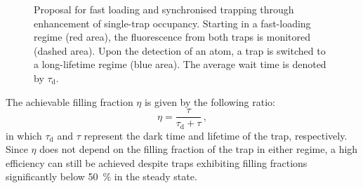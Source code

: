 \documentclass[../Thesis-IJspeert.tex]{subfiles}
\begin{document}
\begin{figure}[t!]
	\caption[Proposal for fast loading and synchronised trapping through enhancement of single-trap occupancy]{Proposal for fast loading and synchronised trapping through enhancement of single-trap occupancy. Starting in a fast-loading regime (red area), the fluorescence from both traps is monitored (dashed area). Upon the detection of an atom, a trap is switched to a long-lifetime regime (blue area). The average wait time is denoted by $\tau_\mathrm{d}$.}
	\label{fastload} 
\end{figure}
The achievable filling fraction $\eta$ is given by the following ratio:
\begin{equation}
\label{achievablefilling}
\eta = \frac{\tau}{\tau_\mathrm{d} + \tau}\,,
\end{equation}
in which $\tau_\mathrm{d}$ and $\tau$ represent the dark time and lifetime of the trap, respectively. Since $\eta$ does not depend on the filling fraction of the trap in either regime, a high efficiency can still be achieved despite traps exhibiting filling fractions significantly below \SI{50}{\percent} in the steady state.
\end{document}

